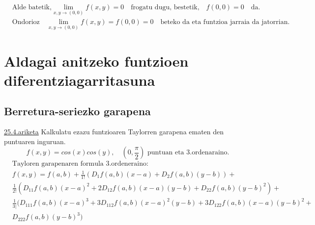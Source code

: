 \begin{align*}
    &\text{Alde batetik,}\lim_{x,y \to (0,0)}f(x,y)=0\quad \text{frogatu dugu, bestetik,}\quad f(0,0)=0 \quad \text{da.}\\ &\text{Ondorioz} \quad \boxed{\lim_{x,y \to (0,0)}f(x,y)=f(0,0)=0} \quad \text{beteko da eta funtzioa jarraia da jatorrian.}
\end{align*}










\chapter{Aldagai anitzeko funtzioen diferentziagarritasuna}
\section{Berretura-seriezko garapena}
\underline{25.4.ariketa} Kalkulatu ezazu funtzioaren Taylorren garapena ematen den puntuaren inguruan.
\begin{equation*}
    f(x,y)=cos(x)cos(y), \quad (0,\frac{\pi}{2}) \text{ puntuan eta 3.ordenaraino.}
\end{equation*}
\begin{equation*}
\begin{split}
    &\text{Tayloren garapenaren formula 3.ordeneraino:}\\
    &f(x,y)=f(a,b)+\frac{1}{1!}(D_1f(a,b)(x-a)+D_2f(a,b)(y-b))+\\
    &\frac{1}{2!}(D_{11}f(a,b)(x-a)^2 +2 D_{12}f(a,b)(x-a)(y-b)+D_{22}f(a,b)(y-b)^2)+\\
    &\frac{1}{3|}(D_{111}f(a,b)(x-a)^3+3D_{112}f(a,b)(x-a)^2(y-b)+3D_{122}f(a,b)(x-a)(y-b)^2+\\
    &D_{222}f(a,b)(y-b)^3)\\
\end{split}
\end{equation*}

